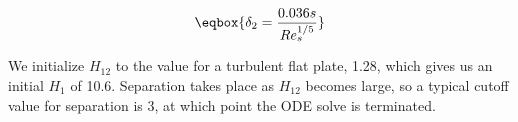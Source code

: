 \begin{equation}
    \eqbox{
    \delta_2 = \frac{0.036 s}{Re_s^{1/5}}
}
\end{equation}

\noindent We initialize \(H_{12}\) to the value for a turbulent flat plate, 1.28, which gives us an initial \(H_1\) of 10.6.
%
Separation takes place as \(H_{12}\) becomes large, so a typical cutoff value for separation is 3, at which point the ODE solve is terminated.






